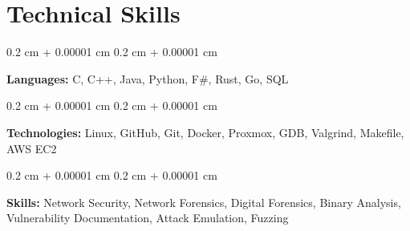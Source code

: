 \documentclass[10pt, letterpaper]{article}
\newenvironment{onecolentry}{
    \begin{adjustwidth}{
        0.2 cm + 0.00001 cm
    }{
        0.2 cm + 0.00001 cm
    }
}{
    \end{adjustwidth}
} %
\begin{document}
\section{Technical Skills}

\begin{onecolentry}
	\textbf{Languages:} C, C++, Java, Python, F\#, Rust, Go, SQL
\end{onecolentry}

\vspace{0.1 cm}

\begin{onecolentry}
	\textbf{Technologies:} Linux, GitHub, Git, Docker, Proxmox, GDB, Valgrind, Makefile, AWS EC2
\end{onecolentry}

\vspace{0.1 cm}

\begin{onecolentry}
  \textbf{Skills:} Network Security, Network Forensics, Digital Forensics, Binary Analysis, Vulnerability Documentation, Attack Emulation, Fuzzing
\end{onecolentry}
\end{document}
